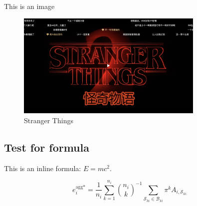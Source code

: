 \documentclass[12pt,a4paper]{article}
\begin{document}
This is an image
\begin{figure}[htbp] %
\centering %
\includegraphics[width=0.8\textwidth]{../pic/EE2_1.png} %
\caption{Stranger Things}
\label{fig:fig 1} %
\end{figure}

\subsection{Test for formula}
This is an inline formula: $E=mc^2$.

\begin{equation}
\label{eq:equ 1}
e_i^{\text{agg}*} = \frac{1}{n_i} \sum_{k=1}^{n_i} \binom{n_i}{k}^{-1} \sum\limits_{\mathcal{S}_{ki} \in \mathcal{B}_{ki}} \pi^k A_{i,\mathcal{S}_{ki}}
\end{equation}

\newpage
\printbibliography[title={References}]
\end{document}
